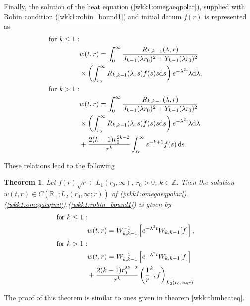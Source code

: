 \documentclass[manuscript, printscheme]{paper}
\newtheorem{thm}{Theorem}[section]
\newcommand{\RM}{\mathbb{R}}
\newcommand{\ZM}{\mathbb{Z}}
\newcommand{\ds}{\operatorname{ds}}
\begin{document}
Finally, the solution of the heat equation (\ref{wkk1:omegaeqpolar}),  supplied with Robin condition (\ref{wkk1:robin_bound1}) and initial datum $f(r)$ is represented as
\begin{align}
{\rm for~} k \leq 1:\nonumber  \\
&w(t,r) = \label{wkk1:heateqdirectsol1}
\int_0^\infty  \frac{  R_{k,k-1}(\lambda, r)} 
{J_{k-1}(\lambda r_0)^2 + Y_{k-1}(\lambda r_0)^2} \\ 
&\times \left ( \int_{r_0}^\infty R_{k,k-1}(\lambda, s)  f(s) s \mathrm{d} s \right )    e^{-\lambda^2 t} \lambda \mathrm{d}\lambda \nonumber,\\
{\rm for~} k > 1: \nonumber \\
&w(t,r) = \label{wkk1:heateqdirectsol2}
\int_0^\infty  \frac{  R_{k,k-1}(\lambda, r)} 
{J_{k-1}(\lambda r_0)^2 + Y_{k-1}(\lambda r_0)^2} \\ 
&\times \left ( \int_{r_0}^\infty R_{k,k-1}(\lambda, s)  f(s) s \mathrm{d} s \right )    e^{-\lambda^2 t} \lambda \mathrm{d}\lambda \nonumber \\
&+ \frac {2(k-1) r_0^{2k-2}} {r^{k}} \int_{r_0}^\infty s^{-k+1} f(s) \ds \nonumber
\end{align}

These relations lead to the following  
\begin{thm} \label{wkk1:thmheateq}
Let $f(r) \sqrt r \in L_1(r_0,\infty)$, $r_0>0$, $k \in \ZM$. Then the solution $w(t,r)\in C\left (\RM_+;L_2(r_0,\infty; r) \right )$ of (\ref{wkk1:omegaeqpolar}), (\ref{wkk1:omegaeqinit}),(\ref{wkk1:robin_bound1}) is given by 
\begin{align}
{\rm for~} k \leq 1:\nonumber  \\
&w(t,r) = W^{-1}_{k,k-1}\left [ e^{-\lambda^2 t} W_{k,k-1}[f] \right ], \label{wkk1:heatsol1}\\
{\rm for~} k > 1: \nonumber \\
&w(t,r) = W^{-1}_{k,k-1}\left [ e^{-\lambda^2 t} W_{k,k-1}[f] \right ]\label{wkk1:heatsol2}\\
&+ \frac {2(k-1) r_0^{2k-2}} {r^{k}} \left (\frac 1 r^{k}, f \right )_{L_2(r_0,\infty; r)} \nonumber
\end{align}
\end{thm}

The proof of this theorem is similar to ones given in theorem \ref{wkk:thmheateq}.
\end{document}
